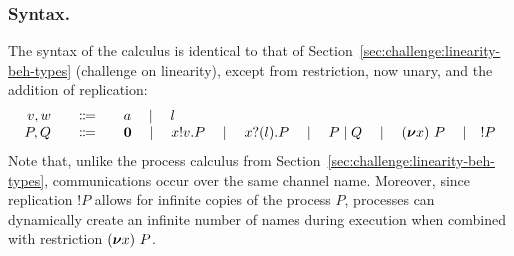\subsubsection{Syntax.}
The syntax of the calculus is identical to that of
Section~\ref{sec:challenge:linearity-beh-types} (challenge on
linearity), except from restriction, now unary, and the addition of
replication:
\begin{displaymath}
  \begin{array}{r@{\qquad}c@{\qquad}l}
    v,w & \Coloneqq & a \quad\mid\quad l \\
    P,Q & \Coloneqq & \Pend
               \quad \mid\quad \Pout{x}{v}{P}
               \quad \mid\quad \Pin{x}{l}{P}
               \quad \mid\quad \Ppar{P}{Q}
               \quad \mid\quad \Pres{x}{}{P}
               \quad \mid\quad !P
  \end{array}
\end{displaymath}
Note that, unlike the process calculus from
Section~\ref{sec:challenge:linearity-beh-types}, communications occur
over the same channel name. Moreover, since replication $!P$ allows
for infinite copies of the process $P$, processes can dynamically
create an infinite number of names during execution when combined with
restriction $(\bm{\nu} x)~{P}$.
%

